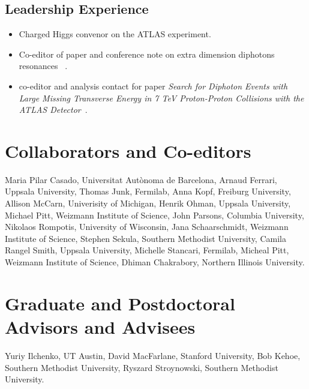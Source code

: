 \documentclass[10pt]{article}
\begin{document}
\subsection*{Leadership Experience}
\begin{itemize}
\item Charged Higgs convenor on the ATLAS experiment.
\item Co-editor of paper and conference note on extra dimension diphotons resonances ~\cite{atl1,atl1-conf}.

\item co-editor and analysis contact for paper {\it Search for Diphoton Events with Large Missing Transverse Energy in 7 TeV Proton-Proton Collisions with the ATLAS Detector}~\cite{atl2}.
\end{itemize}

\section*{Collaborators and Co-editors}
Maria Pilar Casado, Universitat Autònoma de Barcelona, Arnaud Ferrari, Uppsala University, Thomas Junk, Fermilab, Anna Kopf, Freiburg University, Allison McCarn, Univerisity of Michigan, Henrik Ohman, Uppsala University,
Michael Pitt, Weizmann Institute of Science, John Parsons, Columbia University, Nikolaos Rompotis, University of Wisconsin, Jana Schaarschmidt, Weizmann Institute of Science, Stephen Sekula, Southern Methodist University,
Camila Rangel Smith, Uppsala University, Michelle Stancari, Fermilab, Micheal Pitt, Weizmann Institute of Science, Dhiman Chakrabory, Northern Illinois University.

\section*{Graduate and Postdoctoral Advisors and Advisees}
Yuriy Ilchenko, UT Austin, David MacFarlane, Stanford University, Bob Kehoe,
Southern Methodist University, Ryszard Stroynowski, Southern Methodist University.
\end{document}
